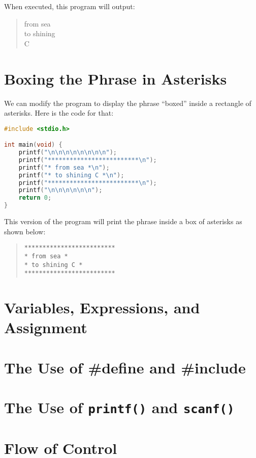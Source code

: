 \documentclass{article}
\begin{document}
When executed, this program will output:

\begin{quote}
from sea \\
to shining \\
C
\end{quote}

\section*{Boxing the Phrase in Asterisks}

We can modify the program to display the phrase ``boxed'' inside a rectangle of asterisks. Here is the code for that:

\begin{lstlisting}[language=C]
#include <stdio.h>

int main(void) {
    printf("\n\n\n\n\n\n\n\n");
    printf("*************************\n");
    printf("* from sea *\n");
    printf("* to shining C *\n");
    printf("*************************\n");
    printf("\n\n\n\n\n\n");
    return 0;
}
\end{lstlisting}

This version of the program will print the phrase inside a box of asterisks as shown below:

\begin{quote}
\begin{verbatim}
*************************
* from sea *
* to shining C *
*************************
\end{verbatim}
\end{quote}


\section{Variables, Expressions, and Assignment} \label{sec:variables_expressions_assignment}
\section{The Use of \#define and \#include} \label{sec:use_define_include}
\section{The Use of \texttt{printf()} and \texttt{scanf()}} \label{sec:use_printf_scanf}
\section{Flow of Control} \label{sec:flow_of_control}
\end{document}
